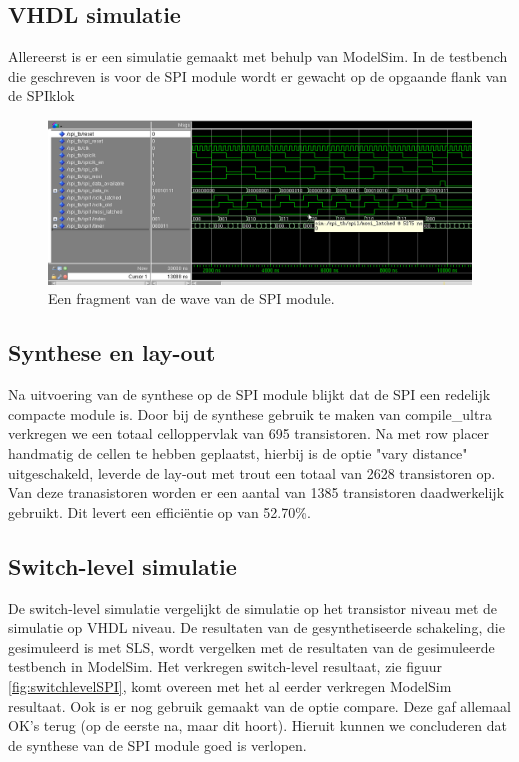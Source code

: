 \documentclass{scrartcl} %
\begin{document}
\subsection{VHDL simulatie}
Allereerst is er een simulatie gemaakt met behulp van ModelSim. In de testbench die geschreven is voor de SPI module wordt er gewacht op de opgaande flank van de SPIklok
\begin{figure}[H]
	\centering
	\includegraphics[width=\textwidth]{resource/waveSPI2.png}
	\caption{Een fragment van de wave van de SPI module.}
	\label{fig:waveSPI2}
\end{figure}

\subsection{Synthese en lay-out}
\label{sec:synthese en lay-out} 
Na uitvoering van de synthese op de SPI module blijkt dat de SPI een redelijk compacte module is. Door bij de synthese gebruik te maken van compile\_ultra verkregen we een totaal celloppervlak van 695 transistoren. Na met row placer handmatig de cellen te hebben geplaatst, hierbij is de optie "vary distance" uitgeschakeld, leverde de lay-out met trout een totaal van 2628 transistoren op. Van deze tranasistoren worden er een aantal van 1385 transistoren daadwerkelijk gebruikt. Dit levert een effici\"entie op van 52.70\%.   %

\subsection{Switch-level simulatie}
De switch-level simulatie vergelijkt de simulatie op het transistor niveau met de simulatie op VHDL niveau. De resultaten van de gesynthetiseerde schakeling, die gesimuleerd is met SLS, wordt vergelken met de resultaten van de gesimuleerde testbench in ModelSim. Het verkregen switch-level resultaat, zie figuur \ref{fig:switchlevelSPI}, komt overeen met het al eerder verkregen ModelSim resultaat. Ook is er nog gebruik gemaakt van de optie compare. Deze gaf allemaal OK's terug (op de eerste na, maar dit hoort). Hieruit kunnen we concluderen dat de synthese van de SPI module goed is verlopen. 
\end{document}
